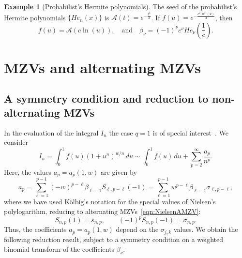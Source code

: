 \documentclass[10pt,reqno,a4paper]{amsart}%
\theoremstyle{definition}
\newtheorem{example}{Example}
\newcommand{\ap}{\ensuremath{\mathcal{A}}}%
\begin{document}
\begin{example}
[Probabilist's Hermite polynomials]The seed of the probabilist's Hermite
polynomials $\{He_{n}(x)\}$ is $\ap(t)=e^{-\frac{t^{2}}{2}}$. If
$f(u)=e^{-\frac{c^{2}\ln^{2}(u)}{2}}$, then
\[
f(u)=\ap(c\ln(u)),\quad\text{and}\quad\beta_{\nu}=(-1)^{\nu}c^{\nu
}He_{\nu}\!\left(  \frac{1}{c}\right)  .
\]

\end{example}

\section{MZVs and alternating MZVs}

\subsection{A symmetry condition and reduction to non-alternating MZVs}

In the evaluation of the integral $I_{n}$ the case $q=1$ is of special
interest~\cite{HKLL2020}. We consider
\[
I_{n}=\int_{0}^{1}f(u)(1+u^{n})^{w/n}\,du\sim\int_{0}^{1}f(u)\,du+\sum
_{p=2}^{\infty}\frac{a_{p}}{n^{p}}.
\]
Here, the values $a_{p}=a_{p}(1,w)$ are given by
\begin{equation}
a_{p}=\sum_{\ell=1}^{p-1}(-w)^{p-\ell}\beta_{\ell-1}S_{\ell,p-\ell
}(-1)=\sum_{\ell=1}^{p-1}w^{p-\ell}\beta_{\ell-1}\sigma_{\ell,p-\ell},
\label{eqn:QuOne0}%
\end{equation}
where we have used K\"{o}lbig's notation for the special values of Nielsen's
polylogarithm, reducing to alternating MZVs~\eqref{eqn:NielsenAMZV}:
\[
S_{n,p}(1)=s_{n,p},\qquad(-1)^{p}S_{n,p}(-1)=\sigma_{n,p}.
\]
Thus, the coefficients $a_{p}=a_{p}(1,w)$ depend on the $\sigma_{j,k}$ values.
We obtain the following reduction result, subject to a symmetry condition on a
weighted binomial transform of the coefficients $\beta_{\nu}$.
\end{document}
